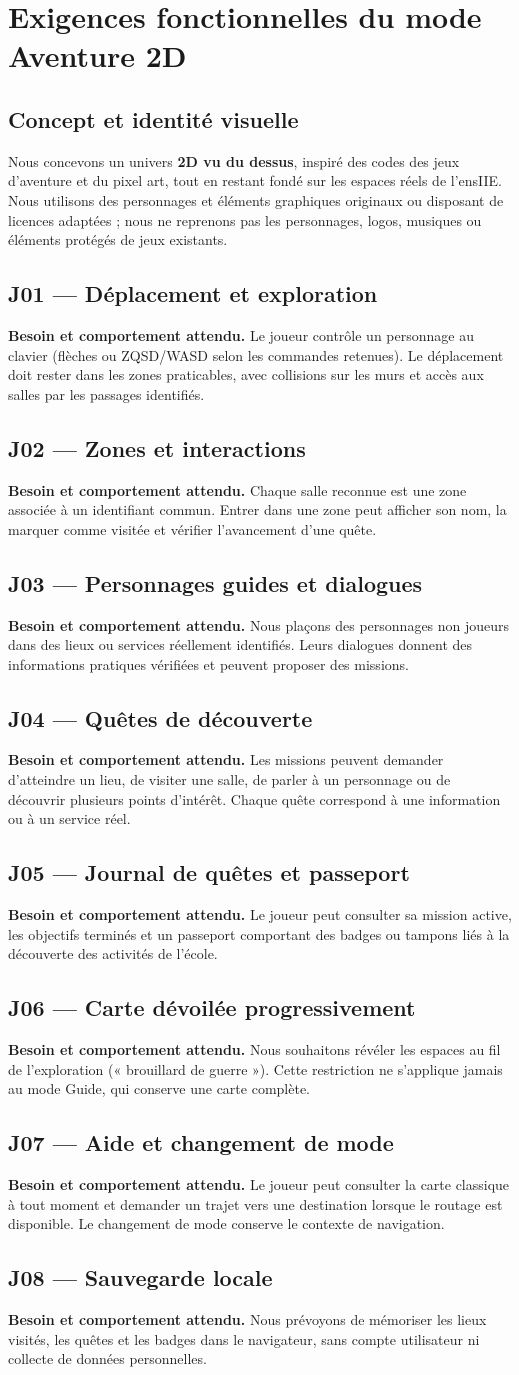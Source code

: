 \documentclass[11pt,a4paper]{article}
\newcommand{\req}[3]{\subsection{#1 --- #2}\noindent\textbf{Besoin et comportement attendu.} #3\par}
\begin{document}
\section{Exigences fonctionnelles du mode Aventure 2D}
\subsection{Concept et identité visuelle}
Nous concevons un univers \textbf{2D vu du dessus}, inspiré des codes des jeux d'aventure et du pixel art, tout en restant fondé sur les espaces réels de l'ensIIE. Nous utilisons des personnages et éléments graphiques originaux ou disposant de licences adaptées ; nous ne reprenons pas les personnages, logos, musiques ou éléments protégés de jeux existants.

\req{J01}{Déplacement et exploration}{Le joueur contrôle un personnage au clavier (flèches ou ZQSD/WASD selon les commandes retenues). Le déplacement doit rester dans les zones praticables, avec collisions sur les murs et accès aux salles par les passages identifiés.}
\req{J02}{Zones et interactions}{Chaque salle reconnue est une zone associée à un identifiant commun. Entrer dans une zone peut afficher son nom, la marquer comme visitée et vérifier l'avancement d'une quête.}
\req{J03}{Personnages guides et dialogues}{Nous plaçons des personnages non joueurs dans des lieux ou services réellement identifiés. Leurs dialogues donnent des informations pratiques vérifiées et peuvent proposer des missions.}
\req{J04}{Quêtes de découverte}{Les missions peuvent demander d'atteindre un lieu, de visiter une salle, de parler à un personnage ou de découvrir plusieurs points d'intérêt. Chaque quête correspond à une information ou à un service réel.}
\req{J05}{Journal de quêtes et passeport}{Le joueur peut consulter sa mission active, les objectifs terminés et un passeport comportant des badges ou tampons liés à la découverte des activités de l'école.}
\req{J06}{Carte dévoilée progressivement}{Nous souhaitons révéler les espaces au fil de l'exploration (« brouillard de guerre »). Cette restriction ne s'applique jamais au mode Guide, qui conserve une carte complète.}
\req{J07}{Aide et changement de mode}{Le joueur peut consulter la carte classique à tout moment et demander un trajet vers une destination lorsque le routage est disponible. Le changement de mode conserve le contexte de navigation.}
\req{J08}{Sauvegarde locale}{Nous prévoyons de mémoriser les lieux visités, les quêtes et les badges dans le navigateur, sans compte utilisateur ni collecte de données personnelles.}
\end{document}
